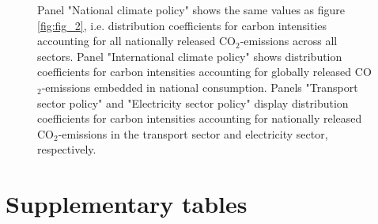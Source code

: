 \documentclass[12pt, a4paper]{article}
\newenvironment{subcaption2}
{\strut
\vspace{-5pt}
\begin{minipage}[b]{0.9\textwidth}
  \hspace*{-\parindent}
  \footnotesize}
 {\end{minipage}}
\begin{document}
\begin{refsection}
\begin{figure}[ht!]
\begin{subcaption2}
    Panel "National climate policy" shows the same values as figure \ref{fig:fig_2}, i.e. distribution coefficients for carbon intensities accounting for all nationally released CO$_{2}$-emissions across all sectors. Panel "International climate policy" shows distribution coefficients for carbon intensities accounting for globally released CO$_{2}$-emissions embedded in national consumption. Panels "Transport sector policy" and "Electricity sector policy" display distribution coefficients for carbon intensities accounting for nationally released CO$_{2}$-emissions in the transport sector and electricity sector, respectively.
    \end{subcaption2}
\end{figure}

\clearpage

\section{Supplementary tables} \label{sec:tables}


\clearpage


\clearpage


\clearpage


\clearpage


\clearpage


\clearpage


\clearpage

%   



\clearpage


\clearpage


\clearpage


\clearpage


\clearpage


\clearpage

\printbibliography[heading=subbibliography, title ={References (Appendix)}]
\end{refsection}
\end{document}
